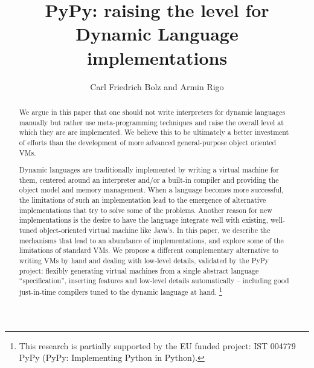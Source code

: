 \documentclass{llncs}
\begin{document}
\pagestyle{headings}

\title{PyPy: raising the level for Dynamic Language implementations}


\author{Carl Friedrich Bolz and Armin Rigo}




\maketitle

\begin{abstract}

We argue in this paper that one should not write interpreters for dynamic
languages manually but rather use meta-programming techniques and raise the
overall level at which they are are implemented. We believe this to be
ultimately a better investment of efforts than the development of more advanced
general-purpose object oriented VMs.

Dynamic languages are traditionally implemented by writing a virtual machine for
them, centered around an interpreter and/or a built-in compiler and providing
the object model and memory management. When a language becomes more successful,
the limitations of such an implementation lead to the emergence of alternative
implementations that try to solve some of the problems. Another reason for new
implementations is the desire to have the language integrate well with existing,
well-tuned object-oriented virtual machine like Java's. In this paper, we
describe the mechanisms that lead to an abundance of implementations, and
explore some of the limitations of standard VMs.  We propose a different
complementary alternative to writing VMs by hand and dealing with low-level
details, validated by the PyPy project: flexibly generating virtual machines
from a single abstract language ``specification'', inserting features and
low-level details automatically -- including good just-in-time compilers tuned
to the dynamic language at hand.
\footnote{This research is partially supported by the EU funded
 project: IST 004779 PyPy (PyPy: Implementing Python in Python).} \\

\end{abstract}
\end{document}
